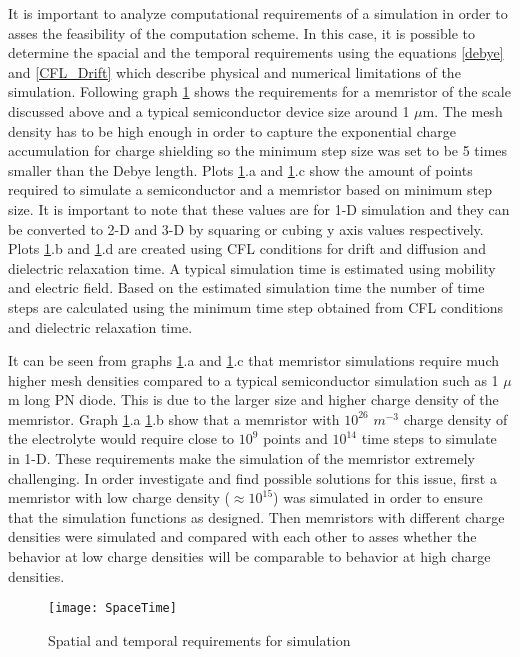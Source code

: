 \begin{doublespace}
It is important to analyze computational requirements of a simulation in order to asses the feasibility of the computation scheme. In this case, it is possible to determine the spacial and the temporal requirements using the equations \ref{debye} and \ref{CFL_Drift} which describe physical and numerical limitations of the simulation. Following graph \ref{SpaceTime} shows the requirements for a memristor of the scale discussed above and a typical semiconductor device size around 1 $\mu$m. The mesh density has to be high enough in order to capture the exponential charge accumulation for charge shielding so the minimum step size was set to be 5 times smaller than the Debye length. Plots \ref{SpaceTime}.a and \ref{SpaceTime}.c show the amount of points required to simulate a semiconductor and a memristor based on minimum step size. It is important to note that these values are for 1-D simulation and they can be converted to 2-D and 3-D by squaring or cubing y axis values respectively. Plots \ref{SpaceTime}.b and \ref{SpaceTime}.d are created using CFL conditions for drift and diffusion and dielectric relaxation time. A typical simulation time is estimated using mobility and electric field. Based on the estimated simulation time the number of time steps are calculated using the minimum time step obtained from CFL conditions and dielectric relaxation time.

It can be seen from graphs \ref{SpaceTime}.a and \ref{SpaceTime}.c that memristor simulations require much higher mesh densities compared to a typical semiconductor simulation such as 1 $\mu$m long PN diode. This is due to the larger size and higher charge density of the memristor. Graph \ref{SpaceTime}.a \ref{SpaceTime}.b show that a memristor with $10^{26}$ $m^{-3}$ charge density of the electrolyte would require close to $10^9$ points and $10^{14}$ time steps to simulate in 1-D. These requirements make the simulation of the memristor extremely challenging. In order investigate and find possible solutions for this issue, first a memristor with low charge density ($\approx 10^{15}$) was simulated in order to ensure that the simulation functions as designed. Then memristors with different charge densities were simulated and compared with each other to asses whether the behavior at low charge densities will be comparable to behavior at high charge densities.

\begin{landscape}
\begin{figure}[htp]
\centering
\texttt{[image: SpaceTime]}
\caption{Spatial and temporal requirements for simulation} 
\label{SpaceTime}
\end{figure}
\end{landscape}



\end{doublespace}
